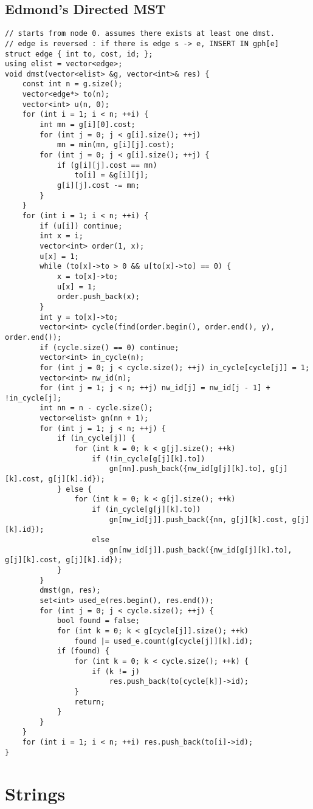 \documentclass[landscape, 8pt, a4paper, oneside,  twocolumn]{extarticle}
\begin{document}
\subsection {Edmond's Directed MST}
\begin{verbatim}
// starts from node 0. assumes there exists at least one dmst.
// edge is reversed : if there is edge s -> e, INSERT IN gph[e]
struct edge { int to, cost, id; };
using elist = vector<edge>;
void dmst(vector<elist> &g, vector<int>& res) {
	const int n = g.size();
	vector<edge*> to(n);
	vector<int> u(n, 0);
	for (int i = 1; i < n; ++i) {
		int mn = g[i][0].cost;
		for (int j = 0; j < g[i].size(); ++j)
			mn = min(mn, g[i][j].cost);
		for (int j = 0; j < g[i].size(); ++j) {
			if (g[i][j].cost == mn)
				to[i] = &g[i][j];
			g[i][j].cost -= mn;
		}
	}
	for (int i = 1; i < n; ++i) {
		if (u[i]) continue;
		int x = i;
		vector<int> order(1, x);
		u[x] = 1;
		while (to[x]->to > 0 && u[to[x]->to] == 0) {
			x = to[x]->to;
			u[x] = 1;
			order.push_back(x);
		}
		int y = to[x]->to;
		vector<int> cycle(find(order.begin(), order.end(), y), order.end());
		if (cycle.size() == 0) continue;
		vector<int> in_cycle(n);
		for (int j = 0; j < cycle.size(); ++j) in_cycle[cycle[j]] = 1;
		vector<int> nw_id(n);
		for (int j = 1; j < n; ++j) nw_id[j] = nw_id[j - 1] + !in_cycle[j];
		int nn = n - cycle.size();
		vector<elist> gn(nn + 1);
		for (int j = 1; j < n; ++j) {
			if (in_cycle[j]) {
				for (int k = 0; k < g[j].size(); ++k)
					if (!in_cycle[g[j][k].to])
						gn[nn].push_back({nw_id[g[j][k].to], g[j][k].cost, g[j][k].id});
			} else {
				for (int k = 0; k < g[j].size(); ++k)
					if (in_cycle[g[j][k].to])
						gn[nw_id[j]].push_back({nn, g[j][k].cost, g[j][k].id});
					else
						gn[nw_id[j]].push_back({nw_id[g[j][k].to], g[j][k].cost, g[j][k].id});
			}
		}
		dmst(gn, res);
		set<int> used_e(res.begin(), res.end());
		for (int j = 0; j < cycle.size(); ++j) {
			bool found = false;
			for (int k = 0; k < g[cycle[j]].size(); ++k)
				found |= used_e.count(g[cycle[j]][k].id);
			if (found) {
				for (int k = 0; k < cycle.size(); ++k) {
					if (k != j)
						res.push_back(to[cycle[k]]->id);
				}
				return;
			}
		}
	}
	for (int i = 1; i < n; ++i) res.push_back(to[i]->id);
}
\end{verbatim}
\section{Strings}
\end{document}
